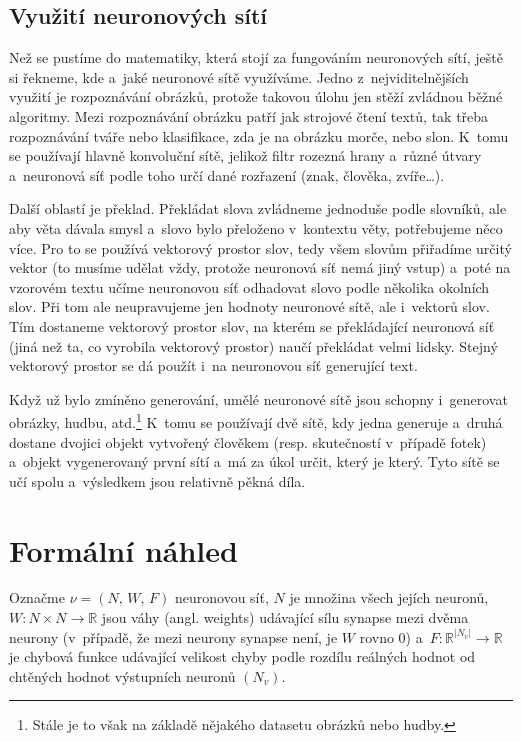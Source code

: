 \documentclass[12pt]{report}			%
\newcommand{\R}{\mathbb{R}}   			%
\begin{document}
				\section{Využití neuronových sítí}
					Než se pustíme do matematiky, která stojí za fungováním neuronových sítí, ještě si řekneme, kde a~jaké neuronové sítě využíváme. Jedno z~nejviditelnějších využití je rozpoznávání obrázků, protože takovou úlohu jen stěží zvládnou běžné algoritmy. Mezi rozpoznávání obrázku patří jak strojové čtení textů, tak třeba rozpoznávání tváře nebo klasifikace, zda je na obrázku morče, nebo slon. K~tomu se používají hlavně konvoluční sítě, jelikož filtr rozezná hrany a~různé útvary a~neuronová síť podle toho určí dané rozřazení (znak, člověka, zvíře\ldots).
					
					Další oblastí je překlad. Překládat slova zvládneme jednoduše podle slovníků, ale aby věta dávala smysl a~slovo bylo přeloženo v~kontextu věty, potřebujeme něco více. Pro to se používá vektorový prostor slov, tedy všem slovům přiřadíme určitý vektor (to musíme udělat vždy, protože neuronová síť nemá jiný vstup) a~poté na vzorovém textu učíme neuronovou síť odhadovat slovo podle několika okolních slov. Při tom ale neupravujeme jen hodnoty neuronové sítě, ale i~vektorů slov. Tím dostaneme vektorový prostor slov, na kterém se překládající neuronová síť (jiná než ta, co vyrobila vektorový prostor) naučí překládat velmi lidsky. Stejný vektorový prostor se dá použít i~na neuronovou síť generující text.
					
					Když už bylo zmíněno generování, umělé neuronové sítě jsou schopny i~generovat obrázky, hudbu, atd.\footnote{Stále je to však na základě nějakého datasetu obrázků nebo hudby.} K~tomu se používají dvě sítě, kdy jedna generuje a~druhá dostane dvojici objekt vytvořený člověkem (resp. skutečností v~případě fotek) a~objekt vygenerovaný první sítí a~má za úkol určit, který je který. Tyto sítě se učí spolu a~výsledkem jsou relativně pěkná díla.
			
			
			\chapter{Formální náhled}
				Označme $\nu = (N,\,W,\,F)$ neuronovou síť, $N$ je množina všech jejích neuronů, $W\!: N\times N \rightarrow \R$ jsou váhy (angl. weights) udávající sílu synapse mezi dvěma neurony (v~případě, že mezi neurony synapse není, je $W$ rovno $0$) a~$F\!: \R^{|N_v|} \rightarrow \R$ je chybová funkce udávající velikost chyby podle rozdílu reálných hodnot od chtěných hodnot výstupních neuronů $\left(N_v\right)$.
			
\end{document}
